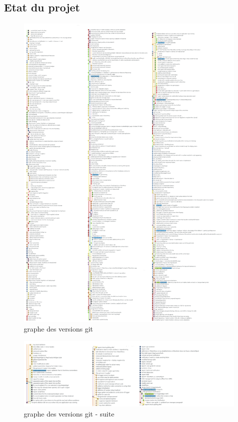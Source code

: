 \subsection{Etat du projet}


\begin{figure}[h!]
	\centering
	\includegraphics[width=1\textwidth]{img/state_git_graph.png}
	\caption{graphe des versions git}
	\label{fig:notification}
\end{figure}

\newpage
\begin{figure}[h!]
	\centering
	\includegraphics[width=1\textwidth]{img/state_git_graph_2.png}
	\caption{graphe des versions git - suite}
	\label{fig:notification}
\end{figure}